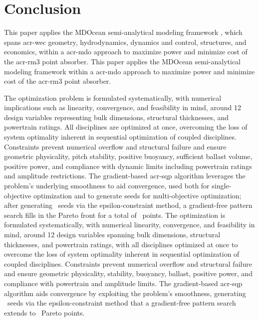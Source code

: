 





\section{Conclusion}

\ifdefined\DISSERTATION
    This paper applies the MDOcean semi-analytical modeling framework \citep{mccabe_development_2026}, which spans \gls{acr-wec} geometry, hydrodynamics, dynamics and control, structures, and economics, within a \gls{acr-mdo} approach to maximize power and minimize cost of the \gls{acr-rm3} point absorber.
\else
    This paper applies the MDOcean semi-analytical modeling framework \citep{mccabe_development_2026} within a \gls{acr-mdo} approach to maximize power and minimize cost of the \gls{acr-rm3} point absorber.
\fi

\ifdefined\DISSERTATION
    The optimization problem is formulated systematically, with numerical implications such as linearity, convergence, and feasibility in mind, around 12 design variables representing bulk dimensions, structural thicknesses, and powertrain ratings.
    All disciplines are optimized at once, overcoming the loss of system optimality inherent in sequential optimization of coupled disciplines.
    Constraints prevent numerical overflow and structural failure and ensure geometric physicality, pitch stability, positive buoyancy, sufficient ballast volume, positive power, and compliance with dynamic limits including powertrain ratings and amplitude restrictions.
    The gradient-based \gls{acr-sqp} algorithm leverages the problem's underlying smoothness to aid convergence, used both for single-objective optimization and to generate seeds for multi-objective optimization; after generating \resultsRE[numParetoSeeds]~seeds via the epsilon-constraint method, a gradient-free pattern search fills in the Pareto front for a total of \resultsRE[numParetoSearchPoints]~points.
\else
    The optimization is formulated systematically, with numerical linearity, convergence, and feasibility in mind, around 12 design variables spanning bulk dimensions, structural thicknesses, and powertrain ratings, with all disciplines optimized at once to overcome the loss of system optimality inherent in sequential optimization of coupled disciplines.
    Constraints prevent numerical overflow and structural failure and ensure geometric physicality, stability, buoyancy, ballast, positive power, and compliance with powertrain and amplitude limits.
    The gradient-based \gls{acr-sqp} algorithm aids convergence by exploiting the problem's smoothness, generating \resultsRE[numParetoSeeds]~seeds via the epsilon-constraint method that a gradient-free pattern search extends to \resultsRE[numParetoSearchPoints]~Pareto points.
\fi

